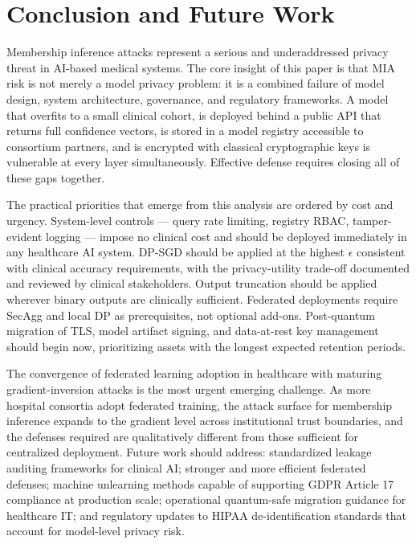 \documentclass[conference]{IEEEtran}
\begin{document}
	\section{Conclusion and Future Work}
	Membership inference attacks represent a serious and underaddressed privacy threat in AI-based medical systems. The core insight of this paper is that MIA risk is not merely a model privacy problem: it is a combined failure of model design, system architecture, governance, and regulatory frameworks. A model that overfits to a small clinical cohort, is deployed behind a public API that returns full confidence vectors, is stored in a model registry accessible to consortium partners, and is encrypted with classical cryptographic keys is vulnerable at every layer simultaneously. Effective defense requires closing all of these gaps together.

	The practical priorities that emerge from this analysis are ordered by cost and urgency. System-level controls --- query rate limiting, registry RBAC, tamper-evident logging --- impose no clinical cost and should be deployed immediately in any healthcare AI system. DP-SGD should be applied at the highest $\epsilon$ consistent with clinical accuracy requirements, with the privacy-utility trade-off documented and reviewed by clinical stakeholders. Output truncation should be applied wherever binary outputs are clinically sufficient. Federated deployments require SecAgg and local DP as prerequisites, not optional add-ons. Post-quantum migration of TLS, model artifact signing, and data-at-rest key management should begin now, prioritizing assets with the longest expected retention periods.

	The convergence of federated learning adoption in healthcare with maturing gradient-inversion attacks is the most urgent emerging challenge. As more hospital consortia adopt federated training, the attack surface for membership inference expands to the gradient level across institutional trust boundaries, and the defenses required are qualitatively different from those sufficient for centralized deployment. Future work should address: standardized leakage auditing frameworks for clinical AI; stronger and more efficient federated defenses; machine unlearning methods capable of supporting GDPR Article 17 compliance at production scale; operational quantum-safe migration guidance for healthcare IT; and regulatory updates to HIPAA de-identification standards that account for model-level privacy risk.
\end{document}
